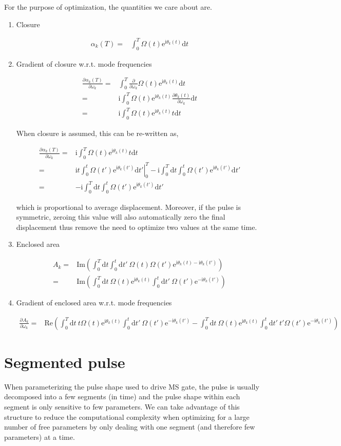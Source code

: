\documentclass[10pt,fleqn]{article}
\newcommand{\ud}{\mathrm{d}}
\newcommand{\ue}{\mathrm{e}}
\newcommand{\ui}{\mathrm{i}}
\newcommand{\eqar}[1]
{
  \begin{align*}
    #1
  \end{align*}
}
\newcommand{\paren}[1]{{\left({#1}\right)}}
\newcommand{\pdiff}[3][{}]{{\frac{\partial^{#1} {#2}}{\partial {#3}{}^{#1}}}}
\begin{document}
For the purpose of optimization, the quantities we care about are.
\begin{enumerate}
\item Closure
  \eqar{
    \alpha_k(T)=&\int_0^T\Omega(t)\ue^{\ui\theta_k(t)}\ud t
  }
\item Gradient of closure w.r.t. mode frequencies
  \eqar{
    \pdiff{\alpha_k(T)}{\omega_k}=&\int_0^T\frac{\partial}{\partial\omega_k}\Omega(t)\ue^{\ui\theta_k(t)}\ud t\\
    =&\ui\int_0^T\Omega(t)\ue^{\ui\theta_k(t)}\frac{\partial\theta_k(t)}{\partial\omega_k}\ud t\\
    =&\ui\int_0^T\Omega(t)\ue^{\ui\theta_k(t)}t\ud t
  }
  When closure is assumed, this can be re-written as,
  \eqar{
    \pdiff{\alpha_k(T)}{\omega_k}=&\ui\int_0^T\Omega(t)\ue^{\ui\theta_k(t)}t\ud t\\
    =&\ui\left.t\int_0^t\Omega(t')\ue^{\ui\theta_k(t')}\ud t'\right|_0^T-\ui\int_0^T\ud t\int_0^t\Omega(t')\ue^{\ui\theta_k(t')}\ud t'\\
    =&-\ui\int_0^T\ud t\int_0^t\Omega(t')\ue^{\ui\theta_k(t')}\ud t'
  }
  which is proportional to average displacement.
  Moreover, if the pulse is symmetric, zeroing this value will also automatically
  zero the final displacement thus remove the need to optimize
  two values at the same time.
\item Enclosed area
  \eqar{
    A_k=&\mathrm{Im}\paren{\int_0^T\!\!\ud t\int_0^t\!\!\ud t'
      \ \Omega(t)\Omega(t')\ue^{\ui\theta_k(t)-\ui\theta_k(t')}}\\
    =&\mathrm{Im}\paren{\int_0^T\!\!\ud t\ \Omega(t)\ue^{\ui\theta_k(t)}\int_0^t\!\!\ud t'
      \ \Omega(t')\ue^{-\ui\theta_k(t')}}
  }
\item Gradient of enclosed area w.r.t. mode frequencies
  \eqar{
    \pdiff{A_k}{\omega_k}
    =&\mathrm{Re}\paren{\int_0^T\!\!\ud t\ t\Omega(t)\ue^{\ui\theta_k(t)}\int_0^t\!\!\ud t'
      \ \Omega(t')\ue^{-\ui\theta_k(t')}-\int_0^T\!\!\ud t\ \Omega(t)\ue^{\ui\theta_k(t)}\int_0^t\!\!\ud t'
      \ t'\Omega(t')\ue^{-\ui\theta_k(t')}}
  }
\end{enumerate}

\section{Segmented pulse}
When parameterizing the pulse shape used to drive MS gate,
the pulse is usually decomposed into a few segments (in time)
and the pulse shape within each segment is only sensitive to
few parameters. We can take advantage of this structure
to reduce the computational complexity when optimizing for
a large number of free parameters by only dealing with one segment
(and therefore few parameters) at a time.\\
\end{document}
